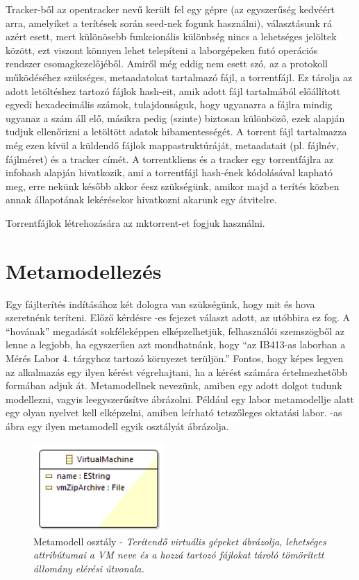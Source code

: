 Tracker-ből az opentracker nevű került fel egy gépre (az egyszerűség kedvéért arra, amelyiket a terítések során seed-nek fogunk használni), választásunk rá azért esett, mert különösebb funkcionális különbség nincs a lehetséges jelöltek között, ezt viszont könnyen lehet telepíteni a laborgépeken futó operációs rendszer csomagkezelőjéből. Amiről még eddig nem esett szó, az a protokoll működéséhez szükséges, metaadatokat tartalmazó fájl, a torrentfájl. Ez tárolja az adott letöltéshez tartozó fájlok hash-eit, amik adott fájl tartalmából előállított egyedi hexadecimális számok, tulajdonságuk, hogy ugyanarra a fájlra mindig ugyanaz a szám áll elő, másikra pedig (szinte) biztosan különböző, ezek alapján tudjuk ellenőrizni a letöltött adatok hibamentességét. A torrent fájl tartalmazza még ezen kívül a küldendő fájlok mappastruktúráját, metaadatait (pl. fájlnév, fájlméret) és a tracker címét. A torrentkliens és a tracker egy torrentfájlra az infohash alapján hivatkozik, ami a torrentfájl hash-ének kódolásával kapható meg, erre nekünk később akkor éesz szükségünk, amikor majd a terítés közben annak állapotának lekérésekor hivatkozni akarunk egy átvitelre.

Torrentfájlok létrehozására az mktorrent-et\cite{mktorrent} fogjuk használni.


\section{Metamodellezés}
Egy fájlterítés indításához két dologra van szükségünk, hogy mit és hova szeretnénk teríteni. Előző kérdésre -es fejezet választ adott, az utóbbira ez fog. A ``hovának'' megadását sokféleképpen elképzelhetjük,  felhasználói szemszögből az lenne a legjobb, ha egyszerűen azt mondhatnánk, hogy ``az IB413-as laborban a Mérés Labor 4. tárgyhoz tartozó környezet terüljön.'' Fontos, hogy képes legyen az alkalmazás egy ilyen kérést végrehajtani, ha a kérést számára értelmezhetőbb formában adjuk át. 
Metamodellnek nevezünk, amiben egy adott dolgot tudunk modellezni, vagyis leegyszerűsítve ábrázolni. Például egy labor metamodellje alatt egy olyan nyelvet kell elképzelni, amiben leírható tetszőleges oktatási labor. -as ábra egy ilyen metamodell egyik osztályát ábrázolja.

\begin{figure}[ht]
	\centering
	\includegraphics[width=50mm, keepaspectratio]{figures/binf_emf_1.png}
	\caption{Metamodell osztály - \textit{Terítendő virtuális gépeket ábrázolja, lehetséges attribútumai a VM neve és a hozzá tartozó fájlokat tároló tömörített állomány elérési útvonala.}}
	\label{fig:emfobj}
\end{figure}

